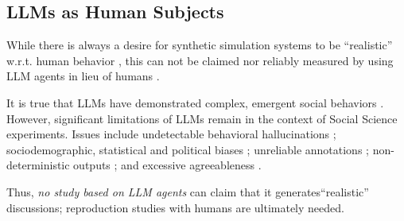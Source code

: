 \subsection{LLMs as Human Subjects}
\label{ssec:related:human-llm}

While there is always a desire for synthetic simulation systems to be ``realistic'' w.r.t. human behavior \citep{grossman_2023, tornberg_2023, argyle2023}, this can not be claimed nor reliably measured by using LLM agents in lieu of humans \citep{rossi_2024}.

It is true that LLMs have demonstrated complex, emergent social behaviors \cite{park2023game, demarzo_2023, leng_2024, abdelnabi_negotiations, abramski_2023, hewitt2024predicting, park2024generativeagentsimulations1000}. However, significant limitations of LLMs remain in the context of Social Science experiments. Issues include undetectable behavioral hallucinations \cite{rossi_2024}; sociodemographic, statistical and political biases \cite{anthis_2025,hewitt2024predicting,rossi_2024, Taubenfeld2024SystematicBI}; unreliable annotations \cite{jansen_2023,bisbee_2023,neumann_2025, Gligoric2024CanUL}; non-deterministic outputs \cite{atil_2025, bisbee_2023}; and excessive agreeableness \cite{Park2023GenerativeAI, anthis_2025, rossi_2024}.

Thus, \emph{no study based on LLM agents} can claim that it generates``realistic'' discussions; reproduction studies with humans are ultimately needed.
